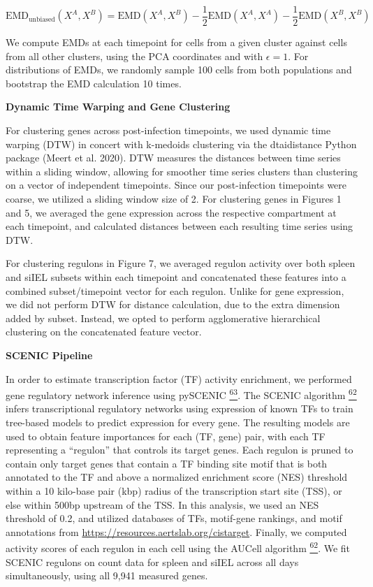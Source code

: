 \[\mathrm{\text{EMD}}_{\mathrm{\text{unbiased}}}(X^{A},X^{B}) = \mathrm{\text{EMD}}(X^{A},X^{B}) - \frac{1}{2}\mathrm{\text{EMD}}(X^{A},X^{A}) - \frac{1}{2}\mathrm{\text{EMD}}(X^{B},X^{B})\]

We compute EMDs at each timepoint for cells from a given cluster against
cells from all other clusters, using the PCA coordinates and with
\(\epsilon = 1\). For distributions of EMDs, we randomly sample 100
cells from both populations and bootstrap the EMD calculation 10 times.

\textbf{Dynamic Time Warping and Gene Clustering}

For clustering genes across post-infection timepoints, we used dynamic
time warping (DTW) in concert with k-medoids clustering via the
dtaidistance Python package (Meert et al. 2020). DTW measures the
distances between time series within a sliding window, allowing for
smoother time series clusters than clustering on a vector of independent
timepoints. Since our post-infection timepoints were coarse, we utilized
a sliding window size of 2. For clustering genes in Figures 1 and 5, we
averaged the gene expression across the respective compartment at each
timepoint, and calculated distances between each resulting time series
using DTW.

For clustering regulons in Figure 7, we averaged regulon activity over
both spleen and siIEL subsets within each timepoint and concatenated
these features into a combined subset/timepoint vector for each regulon.
Unlike for gene expression, we did not perform DTW for distance
calculation, due to the extra dimension added by subset. Instead, we
opted to perform agglomerative hierarchical clustering on the
concatenated feature vector.

\textbf{SCENIC Pipeline}

In order to estimate transcription factor (TF) activity enrichment, we
performed gene regulatory network inference using pySCENIC
\href{https://sciwheel.com/work/citation?ids=9127757\&pre=\&suf=\&sa=0\&dbf=0}{\textsuperscript{63}}.
The SCENIC algorithm
\href{https://sciwheel.com/work/citation?ids=4362786\&pre=\&suf=\&sa=0\&dbf=0}{\textsuperscript{62}}
infers transcriptional regulatory networks using expression of known TFs
to train tree-based models to predict expression for every gene. The
resulting models are used to obtain feature importances for each (TF,
gene) pair, with each TF representing a ``regulon'' that controls its
target genes. Each regulon is pruned to contain only target genes that
contain a TF binding site motif that is both annotated to the TF and
above a normalized enrichment score (NES) threshold within a 10
kilo-base pair (kbp) radius of the transcription start site (TSS), or
else within 500bp upstream of the TSS. In this analysis, we used an NES
threshold of 0.2, and utilized databases of TFs, motif-gene rankings,
and motif annotations from
\url{https://resources.aertslab.org/cistarget}. Finally, we computed
activity scores of each regulon in each cell using the AUCell algorithm
\href{https://sciwheel.com/work/citation?ids=4362786\&pre=\&suf=\&sa=0\&dbf=0}{\textsuperscript{62}}.
We fit SCENIC regulons on count data for spleen and siIEL across all
days simultaneously, using all 9,941 measured genes.

